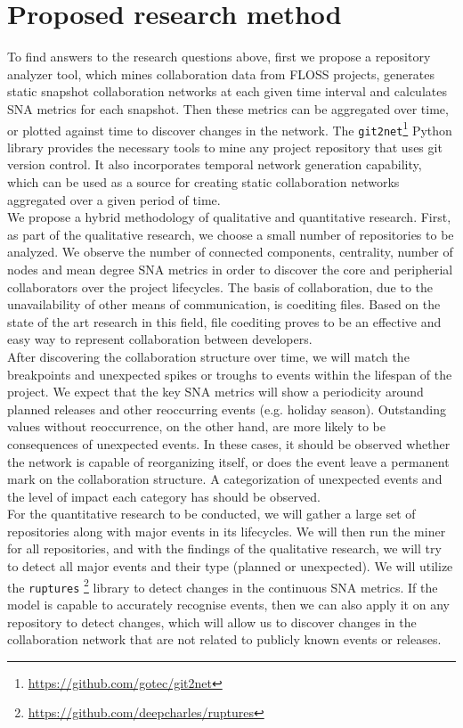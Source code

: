 \section{Proposed research method}
To find answers to the research questions above, first we propose a repository analyzer tool, which mines collaboration data from FLOSS projects, generates static snapshot collaboration networks at each given time interval and calculates SNA metrics for each snapshot. Then these metrics can be aggregated over time, or plotted against time to discover changes in the network. The \texttt{git2net}\footnote{\url{https://github.com/gotec/git2net}} \cite{goteAnalysingTimeStampedCoEditing2019} Python library provides the necessary tools to mine any project repository that uses git version control. It also incorporates temporal network generation capability, which can be used as a source for creating static collaboration networks aggregated over a given period of time. \\


We propose a hybrid methodology of qualitative and quantitative research. First, as part of the qualitative research, we choose a small number of repositories to be analyzed. We observe the number of connected components, centrality, number of nodes and mean degree SNA metrics in order to discover the core and peripherial collaborators over the project lifecycles. The basis of collaboration, due to the unavailability of other means of communication, is coediting files. Based on the state of the art research in this field, file coediting proves to be an effective and easy way to represent collaboration between developers. \\

After discovering the collaboration structure over time, we will match the breakpoints and unexpected spikes or troughs to events within the lifespan of the project. We expect that the key SNA metrics will show a periodicity around planned releases and other reoccurring events (e.g. holiday season). Outstanding values without reoccurrence, on the other hand, are more likely to be consequences of unexpected events. In these cases, it should be observed whether the network is capable of reorganizing itself, or does the event leave a permanent mark on the collaboration structure. A categorization of unexpected events and the level of impact each category has should be observed. \\

For the quantitative research to be conducted, we will gather a large set of repositories along with major events in its lifecycles. We will then run the miner for all repositories, and with the findings of the qualitative research, we will try to detect all major events and their type (planned or unexpected). We will utilize the \texttt{ruptures} \footnote{\url{https://github.com/deepcharles/ruptures}} library to detect changes in the continuous SNA metrics. If the model is capable to accurately recognise events, then we can also apply it on any repository to detect changes, which will allow us to discover changes in the collaboration network that are not related to publicly known events or releases. \\

